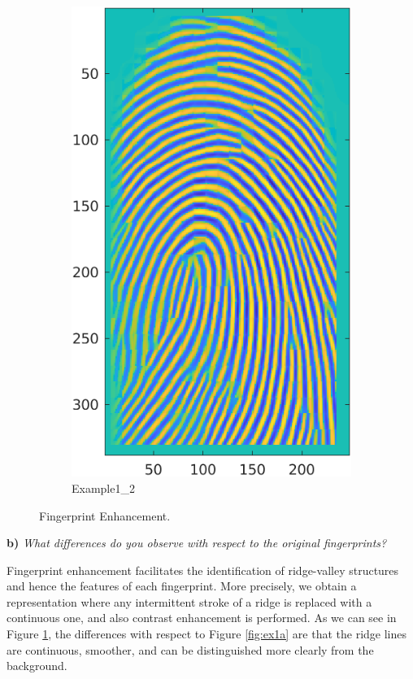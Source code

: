 \documentclass[11pt]{article}
\begin{document}
\begin{figure}[h!]
\begin{subfigure}[t]{0.45\textwidth}
         \centering
         \includegraphics[scale=0.725]{img/enhanced_2}
         \caption{Example1\_2}
     \end{subfigure}
    \caption{Fingerprint Enhancement.}
    \label{fig:ex2a}
\end{figure}


\textbf{b) }\emph{What differences do you observe with respect to the original fingerprints?}

Fingerprint enhancement facilitates the identification of ridge-valley structures and hence the features of each fingerprint. More precisely, we obtain a representation where any intermittent stroke of a ridge is replaced with a continuous one, and also contrast enhancement is performed. As we can see in Figure \ref{fig:ex2a}, the differences with respect to Figure \ref{fig:ex1a} are that the ridge lines are continuous, smoother, and can be distinguished more clearly from the background.\\
\end{document}
